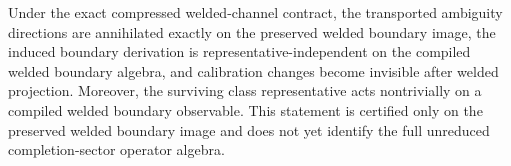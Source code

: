 \begin{corollary}
Under the exact compressed welded-channel contract, the transported ambiguity directions are annihilated exactly on the preserved welded boundary image, the induced boundary derivation is representative-independent on the compiled welded boundary algebra, and calibration changes become invisible after welded projection. Moreover, the surviving class representative acts nontrivially on a compiled welded boundary observable. This statement is certified only on the preserved welded boundary image and does not yet identify the full unreduced completion-sector operator algebra.
\end{corollary}